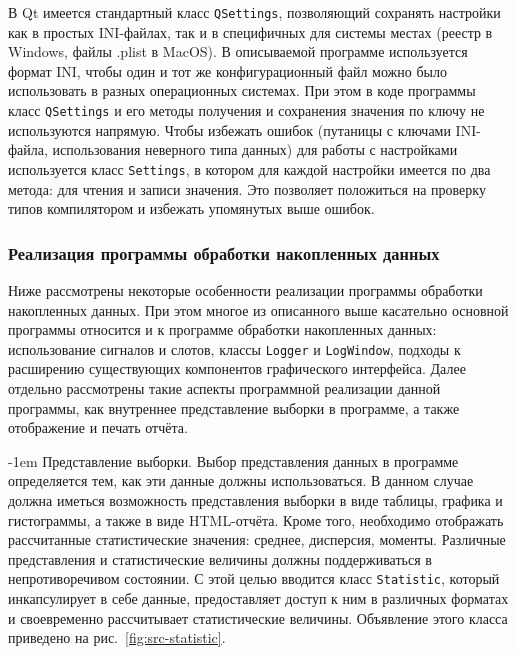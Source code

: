 \documentclass[a4paper, 14pt, titlepage]{extarticle}
\makeatletter
\newcommand{\inlinecode}[1]{\lstinline[basicstyle=\ttfamily]{#1}}
\renewcommand{\paragraph}{%
    \@startsection{paragraph}{4}%
    {\parindent}{\z@}{-1em}%
    {\normalfont\normalsize\bfseries}%
  }
\makeatother
\begin{document}
  В Qt имеется стандартный класс \inlinecode{QSettings}, позволяющий сохранять настройки как в
  простых INI-файлах, так и в специфичных для системы местах (реестр в Windows, файлы .plist в
  MacOS). В описываемой программе используется формат INI, чтобы один и тот же конфигурационный
  файл можно было использовать в разных операционных системах. При этом в коде программы класс
  \inlinecode{QSettings} и его методы получения и сохранения значения по ключу не используются
  напрямую. Чтобы избежать ошибок (путаницы с ключами INI-файла, использования неверного типа
  данных) для работы с настройками используется класс \inlinecode{Settings}, в котором для каждой
  настройки имеется по два метода: для чтения и записи значения. Это позволяет положиться на
  проверку типов компилятором и избежать упомянутых выше ошибок.

  \subsubsection{Реализация программы обработки накопленных данных}

  Ниже рассмотрены некоторые особенности реализации программы обработки накопленных данных.
  При этом многое из описанного выше касательно основной программы относится и к программе обработки
  накопленных данных: использование сигналов и слотов, классы \inlinecode{Logger} и
  \inlinecode{LogWindow}, подходы к расширению существующих компонентов графического интерфейса.
  Далее отдельно рассмотрены такие аспекты программной реализации данной программы, как внутреннее
  представление выборки в программе, а также отображение и печать отчёта.

  \paragraph{Представление выборки.}
  Выбор представления данных в программе определяется тем, как эти данные должны использоваться. В
  данном случае должна иметься возможность представления выборки в виде таблицы, графика и
  гистограммы, а также в виде HTML-отчёта. Кроме того, необходимо отображать рассчитанные
  статистические значения: среднее, дисперсия, моменты. Различные представления и статистические
  величины должны поддерживаться в непротиворечивом состоянии. С этой целью вводится класс
  \inlinecode{Statistic}, который инкапсулирует в себе данные, предоставляет доступ к ним в
  различных форматах и своевременно рассчитывает статистические величины. Объявление этого класса
  приведено на рис.~\ref{fig:src-statistic}.
\end{document}
